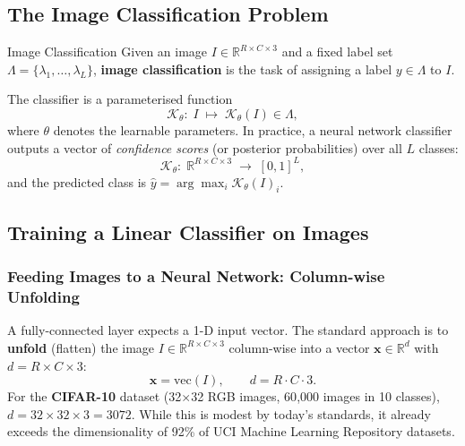 \documentclass[11pt,a4paper]{article}
\begin{document}
\subsection{The Image Classification Problem}
\label{sec:image_classification_problem}

\begin{defbox}{Image Classification}
Given an image $I \in \mathbb{R}^{R \times C \times 3}$ and a fixed label set
$\Lambda = \{\lambda_1, \ldots, \lambda_L\}$, \textbf{image classification} is the task of
assigning a label $y \in \Lambda$ to $I$.

The classifier is a parameterised function
\[
  \mathcal{K}_\theta:\; I \;\longmapsto\; \mathcal{K}_\theta(I) \in \Lambda,
\]
where $\theta$ denotes the learnable parameters.  In practice, a neural network classifier
outputs a vector of \emph{confidence scores} (or posterior probabilities) over all $L$ classes:
\[
  \mathcal{K}_\theta:\; \mathbb{R}^{R \times C \times 3}
    \;\longrightarrow\; [0,1]^L,
\]
and the predicted class is $\hat{y} = \arg\max_i \mathcal{K}_\theta(I)_i$.
\end{defbox}

\subsection{Training a Linear Classifier on Images}
\label{sec:linear_classifier_images}

\subsubsection{Feeding Images to a Neural Network: Column-wise Unfolding}

A fully-connected layer expects a 1-D input vector.  The standard approach is to
\textbf{unfold} (flatten) the image $I \in \mathbb{R}^{R \times C \times 3}$ column-wise into
a vector $\mathbf{x} \in \mathbb{R}^d$ with $d = R \times C \times 3$:
\[
  \mathbf{x} = \mathrm{vec}(I), \qquad d = R \cdot C \cdot 3.
\]
For the \textbf{CIFAR-10} dataset (32$\times$32 RGB images, 60{,}000 images in 10 classes),
$d = 32 \times 32 \times 3 = 3072$.  While this is modest by today's standards, it already
exceeds the dimensionality of 92\% of UCI Machine Learning Repository datasets.
\end{document}
